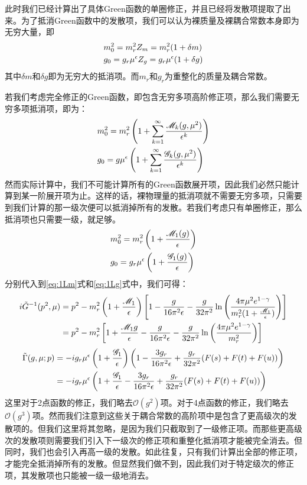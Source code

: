 此时我们已经计算出了具体Green函数的单圈修正，并且已经将发散项提取了出来。为了抵消Green函数中的发散项，我们可以认为裸质量及裸耦合常数本身即为无穷大量，即
\begin{align}
&m_0^2=m_r^2 Z_m=m_r^2(1+\delta m)\notag\\
&g_0=g_r\mu^\epsilon Z_g=g_r\mu^\epsilon(1+\delta g)
\end{align}
其中$\delta m$和$\delta g$即为无穷大的抵消项。而$m_r$和$g_r$为重整化的质量及耦合常数。

若我们考虑完全修正的Green函数，即包含无穷多项高阶修正项，那么我们需要无穷多项抵消项，即为：
\begin{align}
&m_0^2=m_r^2\left(1+\sum_{k=1}^{\infty}\frac{\mathscr{M}_k(g,\mu^2)}{\epsilon^k}\right)\notag\\
&g_0=g\mu^\epsilon\left(1+\sum_{k=1}^{\infty}\frac{\mathscr{G}_k(g,\mu^2)}{\epsilon^k}\right)
\label{eq:bare}
\end{align}
然而实际计算中，我们不可能计算所有的Green函数展开项，因此我们必然只能计算到某一阶展开项为止。这样的话，裸物理量的抵消项就不需要无穷多项，只需要到我们计算的那一级次便可以抵消掉所有的发散。若我们考虑只有单圈修正，那么抵消项也只需要一级，就足够。
\begin{align}
&m_0^2=m_r^2\left(1+\frac{\mathscr{M}_1(g)}{\epsilon}\right)\notag\\
&g_0=g_r\mu^\epsilon\left(1+\frac{\mathscr{G}_1(g)}{\epsilon}\right)
\end{align}
分别代入到\eqref{eq:1Lm}式和\eqref{eq:1Lg}式中，我们可得：
\begin{align}
i\tilde{G}^{-1}(p^2,\mu)&=p^2-m_r^2\left(1+\frac{\mathscr{M}_1}{\epsilon}\right)\left[1-\frac{g}{16\pi^2\epsilon}-\frac{g}{32\pi^2}\ln\left(\frac{4\pi\mu^2 e^{1-\gamma}}{m_r^2(1+\frac{\mathscr{M}_1}{\epsilon})}\right)\right]\notag\\
&=p^2-m_r^2\left[1+\frac{\mathscr{M}_1g}{\epsilon}-\frac{g}{16\pi^2\epsilon}-\frac{g}{32\pi^2}\ln\left(\frac{4\pi\mu^2 e^{1-\gamma}}{m_r^2}\right)\right]
\end{align}
\begin{align}
\tilde{\Gamma}(g,\mu;p)&=-ig_r\mu^\epsilon\left(1+\frac{\mathscr{G}_1}{\epsilon}\right)\left(1-\frac{3g_r}{16\pi^2\epsilon}+\frac{g_r}{32\pi^2}(F(s)+F(t)+F(u))\right)\notag\\
&=-ig_r\mu^\epsilon\left(1+\frac{\mathscr{G}_1}{\epsilon}-\frac{3g_r}{16\pi^2\epsilon}+\frac{g_r}{32\pi^2}(F(s)+F(t)+F(u))\right)
\end{align}
这里对于2点函数的修正，我们略去$\mathcal{O}(g^2)$项。对于4点函数的修正，我们略去$\mathcal{O}(g^3)$项。然而我们注意到这些关于耦合常数的高阶项中是包含了更高级次的发散项的。但我们这里将其忽略，是因为我们只截取到了一级修正项。而那些更高级次的发散项则需要我们引入下一级次的修正项和重整化抵消项才能被完全消去。但同时，我们也会引入再高一级的发散。如此往复，只有我们计算出全部的修正项，才能完全抵消掉所有的发散。但显然我们做不到，因此我们对于特定级次的修正项，其发散项也只能被一级一级地消去。

